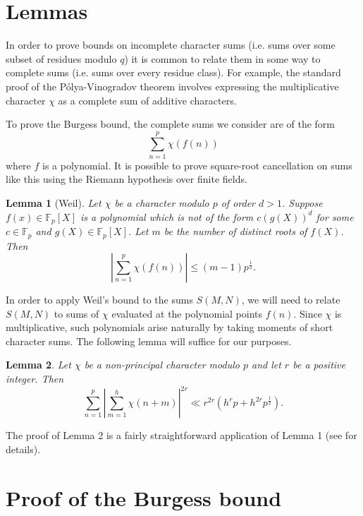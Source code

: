 \documentclass[a4paper,11pt,twoside]{amsart}
\newtheorem{lemma}{Lemma}
\begin{document}
\section{Lemmas}
In order to prove bounds on incomplete character sums (i.e. sums over some subset of residues modulo $q$) it is common to relate them in some way to complete sums (i.e. sums over every residue class). For example, the standard proof of the P\'{o}lya-Vinogradov theorem involves expressing the multiplicative character $\chi$ as a complete sum of additive characters.

To prove the Burgess bound, the complete sums we consider are of the form
\[
\sum_{n=1}^p \chi(f(n))
\]
where $f$ is a polynomial. It is possible to prove square-root cancellation on sums like this using the Riemann hypothesis over finite fields.

\begin{lemma}[Weil]
Let $\chi$ be a character modulo $p$ of order $d > 1$. Suppose $f(x) \in \mathbb{F}_p[X]$ is a polynomial which is not of the form $c (g(X))^d$ for some $c \in \mathbb{F}_p$ and $g(X) \in \mathbb{F}_p[X]$. Let $m$ be the number of distinct roots of $f(X)$. Then
\[
\left| \sum_{n=1}^p \chi(f(n)) \right| \leq (m-1) p^{\frac{1}{2}}.
\]
\end{lemma}

In order to apply Weil's bound to the sums $S(M,N)$, we will need to relate $S(M,N)$ to sums of $\chi$ evaluated at the polynomial points $f(n)$. Since $\chi$ is multiplicative, such polynomials arise naturally by taking moments of short character sums. The following lemma will suffice for our purposes.

\begin{lemma}
Let $\chi$ be a non-principal character modulo $p$ and let $r$ be a positive integer. Then
\[
\sum_{n=1}^p \left| \sum_{m=1}^h \chi(n+m) \right| ^{2r} \ll r^{2r} \left(h^r p + h^{2r} p^{\frac{1}{2}}\right).
\]
\end{lemma}

The proof of Lemma 2 is a fairly straightforward application of Lemma 1 (see \cite[Lemma 9.26]{montgomery2007v} for details).

\section{Proof of the Burgess bound}
\end{document}
